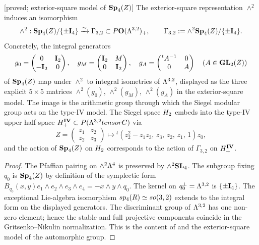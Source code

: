 \begin{proposition}
\label{prop:psp4-iso-so32}
\textnormal{[proved; exterior-square model of $\mathbf{Sp}_4(Z)$]}
The exterior-square representation
$\wedge^2$ induces an isomorphism
\[
\wedge^2:\mathbf{Sp}_4(Z)/\{\pm\mathbf{I}_4\}
\xrightarrow{\sim}
\Gamma_{3,2}\subset P\mathbf{O}(\Lambda^{3,2})_+,
\qquad
\Gamma_{3,2}:=\wedge^2\mathbf{Sp}_4(Z)/\{\pm\mathbf{I}_4\}.
\]
Concretely, the integral generators
\[
g_0=\begin{pmatrix}0&\mathbf{I}_2\\-\mathbf{I}_2&0\end{pmatrix},\quad
g_M=\begin{pmatrix}\mathbf{I}_2&M\\ 0&\mathbf{I}_2\end{pmatrix},\quad
g_A=\begin{pmatrix}{}^tA^{-1}&0\\ 0&A\end{pmatrix}
\quad(A\in\mathbf{GL}_2(Z))
\]
of $\mathbf{Sp}_4(Z)$ map under $\wedge^2$ to integral isometries of
$\Lambda^{3,2}$, displayed as the three explicit $5\times 5$ matrices
$\wedge^2(g_0)$, $\wedge^2(g_M)$, $\wedge^2(g_A)$ in the exterior-square model.  The image is the arithmetic group through which
the Siegel modular group acts on the type-IV model.
The Siegel space $H_2$ embeds into the type-IV upper half-space
$H^{\mathbf{IV}}_+\subset P(\Lambda^{3,2}tensorC)$ via
\[
Z=\begin{pmatrix}z_1&z_2\\ z_2&z_3\end{pmatrix}
\mapsto
{}^t(z_2^2-z_1z_3,\,z_3,\,z_2,\,z_1,\,1)z_0,
\]
and the action of $\mathbf{Sp}_4(Z)$ on $H_2$ corresponds to the action
of $\Gamma_{3,2}$ on $H^{\mathbf{IV}}_+$.
\end{proposition}

\begin{proof}
The Pfaffian pairing on $\wedge^2\Lambda^4$ is preserved by
$\wedge^2\mathbf{SL}_4$.  The subgroup fixing $q_0$ is $\mathbf{Sp}_4(Z)$ by
definition of the symplectic form
$B_{q_0}(x,y)e_1\wedge e_2\wedge e_3\wedge e_4=-x\wedge y\wedge q_0$.
The kernel on $q_0^\perp=\Lambda^{3,2}$ is $\{\pm\mathbf{I}_4\}$.  The
exceptional Lie-algebra isomorphism $sp_4(R)\simeq so(3,2)$
extends to the integral form on the displayed generators.  The
discriminant group of $\Lambda^{3,2}$ has one non-zero element; hence the
stable and full projective components coincide in the
Gritsenko--Nikulin normalization.  This is the content of
\cite[Section~3]{GN} and the exterior-square model of the
automorphic group.
\end{proof}

